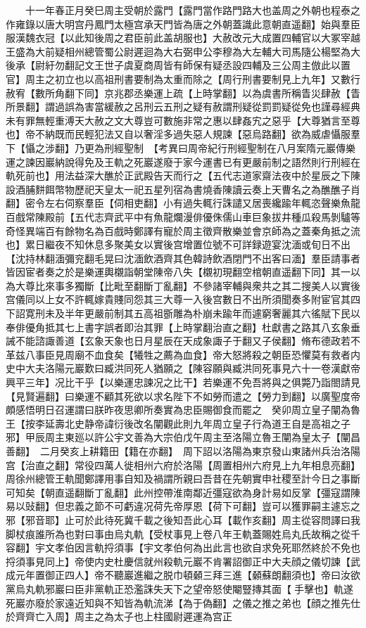 　　十一年春正月癸巳周主受朝於露門【露門當作路門路大也盖周之外朝也程泰之作雍錄以唐大明宫丹鳳門太極宫承天門皆為唐之外朝蓋識此意朝直遥翻】始與羣臣服漢魏衣冠【以此知後周之君臣前此盖胡服也】大赦改元大成置四輔官以大冢宰越王盛為大前疑相州總管蜀公尉遲迴為大右弼申公李穆為大左輔大司馬隨公楊堅為大後承【尉紆勿翻記文王世子虞夏商周皆有師保有疑丞設四輔及三公周主倣此以置官】周主之初立也以高祖刑書要制為太重而除之【周行刑書要制見上九年】又數行赦宥【數所角翻下同】京兆郡丞樂運上疏【上時掌翻】以為虞書所稱眚災肆赦【眚所景翻】謂過誤為害當緩赦之呂刑云五刑之疑有赦謂刑疑從罰罰疑從免也謹尋經典未有罪無輕重溥天大赦之文大尊豈可數施非常之惠以肆姦宄之惡乎【大尊猶言至尊也】帝不納既而民輕犯法又自以奢淫多過失惡人規諫【惡烏路翻】欲為威虐懾服羣下【懾之涉翻】乃更為刑經聖制　【考異曰周帝紀行刑經聖制在八月案隋元巖傳樂運之諫因巖納說得免及王軌之死巖遂廢于家今運書已有更嚴前制之語然則行刑經在軌死前也】用法益深大醮於正武殿告天而行之【五代志道家齋法夜中於星辰之下陳設酒脯䴵餌幣物歷祀天皇太一祀五星列宿為書燒香陳讀云奏上天曹名之為醮醮子肖翻】密令左右伺察羣臣【伺相吏翻】小有過失輒行誅譴又居喪纔踰年輒恣聲樂魚龍百戲常陳殿前【五代志齊武平中有魚龍爛漫俳優侏儒山車巨象拔井種瓜殺馬剝驢等奇怪異端百有餘物名為百戲時鄭譯有寵於周主徵齊散樂並會京師為之蓋秦角抵之流也】累日繼夜不知休息多聚美女以實後宫增置位號不可詳録遊宴沈湎或旬日不出【沈持林翻湎彌兖翻毛晃曰沈湎飲酒齊其色韓詩飲酒閉門不出客曰湎】羣臣請事者皆因宦者奏之於是樂運輿櫬詣朝堂陳帝八失【櫬初現翻空棺朝直遥翻下同】其一以為大尊比來事多獨斷【比毗至翻斷丁亂翻】不參諸宰輔與衆共之其二搜美人以實後宫儀同以上女不許輒嫁貴賤同怨其三大尊一入後宫數日不出所須聞奏多附宦官其四下詔寛刑未及半年更嚴前制其五高祖斵雕為朴崩未踰年而遽窮奢麗其六徭賦下民以奉俳優角抵其七上書字誤者即治其罪【上時掌翻治直之翻】杜獻書之路其八玄象垂誡不能諮諏善道【玄象天象也日月星辰在天成象諏子于翻又子侯翻】脩布德政若不革兹八事臣見周廟不血食矣【犧牲之薦為血食】帝大怒將殺之朝臣恐懼莫有救者内史中大夫洛陽元巖歎曰臧洪同死人猶願之【陳容願與臧洪同死事見六十一卷漢獻帝興平三年】况比干乎【以樂運忠諫况之比干】若樂運不免吾將與之俱斃乃詣閤請見【見賢遍翻】曰樂運不顧其死欲以求名陛下不如勞而遣之【勞力到翻】以廣聖度帝頗感悟明日召運謂曰朕昨夜思卿所奏實為忠臣賜御食而罷之　癸卯周立皇子闡為魯王【按李延壽北史静帝諱衍後改名闡觀此則九年周立皇子行為道王自是高祖之子邪】甲辰周主東廵以許公宇文善為大宗伯戊午周主至洛陽立魯王闡為皇太子【闡昌善翻】　二月癸亥上耕籍田【籍在亦翻】　周下詔以洛陽為東京發山東諸州兵治洛陽宫【治直之翻】常役四萬人徙相州六府於洛陽【周置相州六府見上九年相息亮翻】　周徐州總管王軌聞鄭譯用事自知及禍謂所親曰吾昔在先朝實申社稷至計今日之事斷可知矣【朝直遥翻斷丁亂翻】此州控帶淮南鄰近彊寇欲為身計易如反掌【彊寇謂陳易以䜴翻】但忠義之節不可虧違况荷先帝厚恩【荷下可翻】豈可以獲罪嗣主遽忘之邪【邪音耶】止可於此待死冀千載之後知吾此心耳【載作亥翻】周主從容問譯曰我脚杖痕誰所為也對曰事由烏丸軌【受杖事見上卷八年王軌蓋賜姓烏丸氏故稱之從千容翻】宇文孝伯因言軌捋須事【宇文孝伯何為出此言也欲自求免死耶然終於不免也捋須事見同上】帝使内史杜慶信就州殺軌元巖不肯署詔御正中大夫顔之儀切諫【武成元年置御正四人】帝不聽巖進繼之脱巾頓顙三拜三進【顙蘇朗翻須也】帝曰汝欲黨烏丸軌邪巖曰臣非黨軌正恐濫誅失天下之望帝怒使閹豎摶其面【手擊也】軌遂死巖亦廢於家遠近知與不知皆為軌流涕【為于偽翻】之儀之推之弟也【顔之推先仕於齊齊亡入周】周主之為太子也上柱國尉遲運為宫正